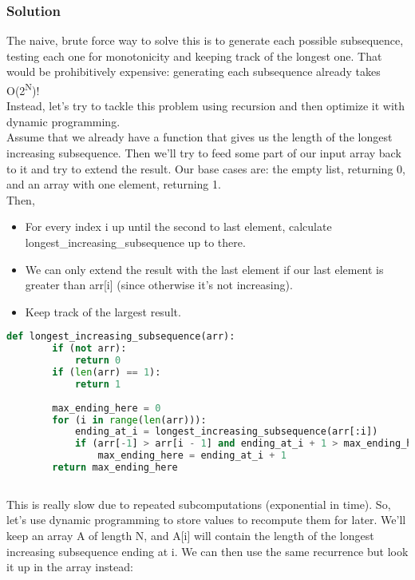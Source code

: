\documentclass[12pt]{article}
\begin{document}
	\subsubsection{Solution}
	The naive, brute force way to solve this is to generate each possible subsequence, testing each one for monotonicity and keeping track of the longest one. That would be prohibitively expensive: generating each subsequence already takes O(2\textsuperscript{N})!\\
    Instead, let’s try to tackle this problem using recursion and then optimize it with dynamic programming.\\
    Assume that we already have a function that gives us the length of the longest increasing subsequence. Then we’ll try to feed some part of our input array back to it and try to extend the result. Our base cases are: the empty list, returning 0, and an array with one element, returning 1.\\
    Then,
    \begin{itemize}
        \item For every index i up until the second to last element, calculate longest\_increasing\_subsequence up to there.
        \item We can only extend the result with the last element if our last element is greater than arr[i] (since otherwise it’s not increasing).
        \item Keep track of the largest result.
    \end{itemize}
    
    \begin{lstlisting}[language=Python]
	def longest_increasing_subsequence(arr):
        if (not arr):
            return 0
        if (len(arr) == 1):
            return 1
    
        max_ending_here = 0
        for (i in range(len(arr))):
            ending_at_i = longest_increasing_subsequence(arr[:i])
            if (arr[-1] > arr[i - 1] and ending_at_i + 1 > max_ending_here):
                max_ending_here = ending_at_i + 1
        return max_ending_here
        
    \end{lstlisting}
    
    This is really slow due to repeated subcomputations (exponential in time). So, let’s use dynamic programming to store values to recompute them for later.
    \newpage
    We’ll keep an array A of length N, and A[i] will contain the length of the longest increasing subsequence ending at i. We can then use the same recurrence but look it up in the array instead:
    
\end{document}
